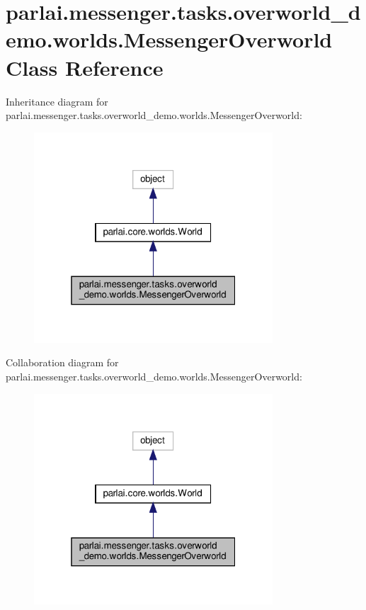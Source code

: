 \hypertarget{classparlai_1_1messenger_1_1tasks_1_1overworld__demo_1_1worlds_1_1MessengerOverworld}{}\section{parlai.\+messenger.\+tasks.\+overworld\+\_\+demo.\+worlds.\+Messenger\+Overworld Class Reference}
\label{classparlai_1_1messenger_1_1tasks_1_1overworld__demo_1_1worlds_1_1MessengerOverworld}


Inheritance diagram for parlai.\+messenger.\+tasks.\+overworld\+\_\+demo.\+worlds.\+Messenger\+Overworld\+:
\nopagebreak
\begin{figure}[H]
\begin{center}
\leavevmode
\includegraphics[width=253pt]{classparlai_1_1messenger_1_1tasks_1_1overworld__demo_1_1worlds_1_1MessengerOverworld__inherit__graph}
\end{center}
\end{figure}


Collaboration diagram for parlai.\+messenger.\+tasks.\+overworld\+\_\+demo.\+worlds.\+Messenger\+Overworld\+:
\nopagebreak
\begin{figure}[H]
\begin{center}
\leavevmode
\includegraphics[width=253pt]{classparlai_1_1messenger_1_1tasks_1_1overworld__demo_1_1worlds_1_1MessengerOverworld__coll__graph}
\end{center}
\end{figure}
